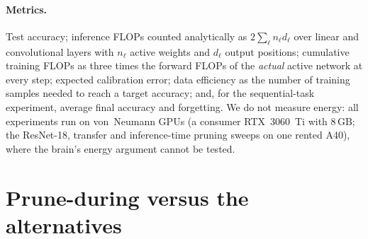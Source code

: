 \documentclass[11pt]{article}
\begin{document}
\paragraph{Metrics.} Test accuracy; inference FLOPs counted analytically as $2\sum_\ell n_\ell d_\ell$ over linear and
convolutional layers with $n_\ell$ active weights and $d_\ell$ output positions; cumulative training FLOPs as three times the
forward FLOPs of the \emph{actual} active network at every step; expected calibration error; data efficiency as the number
of training samples needed to reach a target accuracy; and, for the sequential-task experiment, average final accuracy and
forgetting. We do not measure energy: all experiments run on von~Neumann GPUs
(a consumer RTX~3060~Ti with 8\,GB; the ResNet-18, transfer and inference-time pruning sweeps on one rented A40), where the
brain's energy argument cannot be tested.

\section{Prune-during versus the alternatives}
\label{sec:core}
\end{document}
